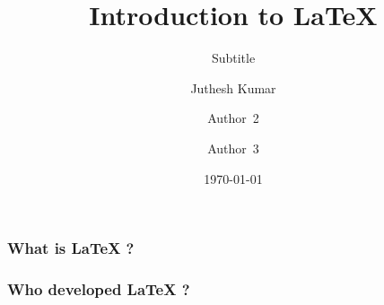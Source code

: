 \documentclass{beamer}
\begin{document}
    \begin{frame}
        \title{Introduction to \LaTeX{}}
        \author{Juthesh Kumar \and 
        Author~2 \and
        Author~3}
        \date{\today}
        \subtitle{Subtitle}
        \maketitle
    \end{frame}
    \begin{frame}
        \frametitle{What is LaTeX ?}
        \blindtext
    \end{frame}
    \begin{frame}
        \frametitle{Who developed LaTeX ?}
        \blindtext[1]
    \end{frame}
\end{document}
